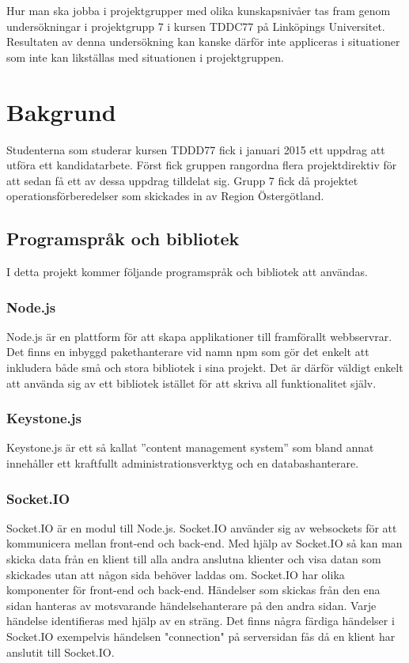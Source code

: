 \documentclass{article}
\begin{document}
Hur man ska jobba i projektgrupper med olika kunskapsnivåer tas fram genom undersökningar i projektgrupp 7 i kursen TDDC77 på Linköpings Universitet. Resultaten av denna undersökning kan kanske därför inte appliceras i situationer som inte kan likställas med situationen i projektgruppen.

\section{Bakgrund}
Studenterna som studerar kursen TDDD77 fick i januari 2015 ett uppdrag att utföra ett kandidatarbete. Först fick gruppen rangordna flera projektdirektiv för att sedan få ett av dessa uppdrag tilldelat sig. Grupp 7 fick då projektet operationsförberedelser som skickades in av Region Östergötland.

\subsection{Programspråk och bibliotek}
I detta projekt kommer följande programspråk och bibliotek att användas.

\subsubsection{Node.js}
Node.js är en plattform för att skapa applikationer till framförallt webbservrar. Det finns en inbyggd pakethanterare vid namn npm som gör det enkelt att inkludera både små och stora bibliotek i sina projekt. Det är därför väldigt enkelt att använda sig av ett bibliotek istället för att skriva all funktionalitet själv.

\subsubsection{Keystone.js}
Keystone.js är ett så kallat ''content management system'' som bland annat innehåller ett kraftfullt administrationsverktyg och en databashanterare.

\subsubsection{Socket.IO}
Socket.IO är en modul till Node.js. Socket.IO använder sig av websockets för att kommunicera mellan front-end och back-end. Med hjälp av Socket.IO så kan man skicka data från en klient till alla andra anslutna klienter och visa datan som skickades utan att någon sida behöver laddas om.
Socket.IO har olika komponenter för front-end och back-end. Händelser som skickas från den ena sidan hanteras av motsvarande händelsehanterare på den andra sidan. Varje händelse identifieras med hjälp av en sträng. Det finns några färdiga händelser i Socket.IO exempelvis händelsen "connection" på serversidan fås då en klient har anslutit till Socket.IO.
\end{document}
